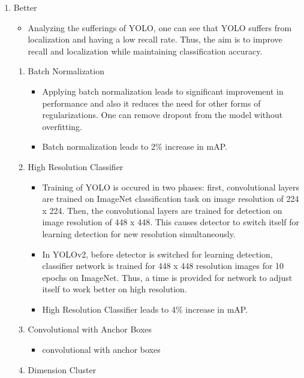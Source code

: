 \documentclass{article}
\begin{document}
\begin{enumerate}
    \item Better
    \begin{itemize}
        \item Analyzing the sufferings of YOLO, one can see that YOLO suffers from 
        localization and having a low recall rate. Thus, the aim is to improve 
        recall and localization while maintaining classification accuracy.
    \end{itemize}
    \begin{enumerate}
        \item Batch Normalization
        \begin{itemize}
            \item Applying batch normalization leads to significant improvement in 
            performance and also it reduces the need for other forms of 
            regularizations. One can remove dropout from the model without 
            overfitting.
            \item Batch normalization leads to 2\% increase in mAP.
        \end{itemize}
        \item High Resolution Classifier
        \begin{itemize}
            \item Training of YOLO is occured in two phases: first, convolutional 
            layers are trained on ImageNet classification task on image resolution 
            of 224 x 224. Then, the convolutional layers are trained for detection 
            on image resolution of 448 x 448. This causes detector to switch itself 
            for learning detection for new resolution simultaneously.
            \item In YOLOv2, before detector is switched for learning detection, 
            classifier network is trained for 448 x 448 resolution images for 10 
            epochs on ImageNet. Thus, a time is provided for network to adjust 
            itself to work better on high resolution.
            \item High Resolution Classifier leads to 4\% increase in mAP.
        \end{itemize}
        \item Convolutional with Anchor Boxes
        \begin{itemize}
            \item convolutional with anchor boxes
        \end{itemize}
        \item Dimension Cluster

\end{enumerate}
\end{enumerate}
\end{document}
